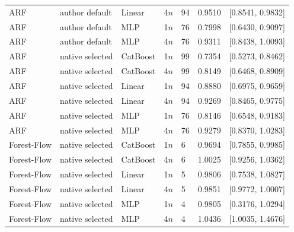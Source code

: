 \begin{longtable}{lllllrr}
ARF & author default & Linear & 4$n$ & 94 & 0.9510 & [0.8541, 0.9832] \\
ARF & author default & MLP & 1$n$ & 76 & 0.7998 & [0.6430, 0.9097] \\
ARF & author default & MLP & 4$n$ & 76 & 0.9311 & [0.8438, 1.0093] \\
ARF & native selected & CatBoost & 1$n$ & 99 & 0.7354 & [0.5273, 0.8462] \\
ARF & native selected & CatBoost & 4$n$ & 99 & 0.8149 & [0.6468, 0.8909] \\
ARF & native selected & Linear & 1$n$ & 94 & 0.8880 & [0.6975, 0.9659] \\
ARF & native selected & Linear & 4$n$ & 94 & 0.9269 & [0.8465, 0.9775] \\
ARF & native selected & MLP & 1$n$ & 76 & 0.8146 & [0.6548, 0.9183] \\
ARF & native selected & MLP & 4$n$ & 76 & 0.9279 & [0.8370, 1.0283] \\
Forest-Flow & native selected & CatBoost & 1$n$ & 6 & 0.9694 & [0.7855, 0.9985] \\
Forest-Flow & native selected & CatBoost & 4$n$ & 6 & 1.0025 & [0.9256, 1.0362] \\
Forest-Flow & native selected & Linear & 1$n$ & 5 & 0.9806 & [0.7538, 1.0827] \\
Forest-Flow & native selected & Linear & 4$n$ & 5 & 0.9851 & [0.9772, 1.0007] \\
Forest-Flow & native selected & MLP & 1$n$ & 4 & 0.9805 & [0.3176, 1.0294] \\
Forest-Flow & native selected & MLP & 4$n$ & 4 & 1.0436 & [1.0035, 1.4676] \\
\bottomrule
\end{longtable}

